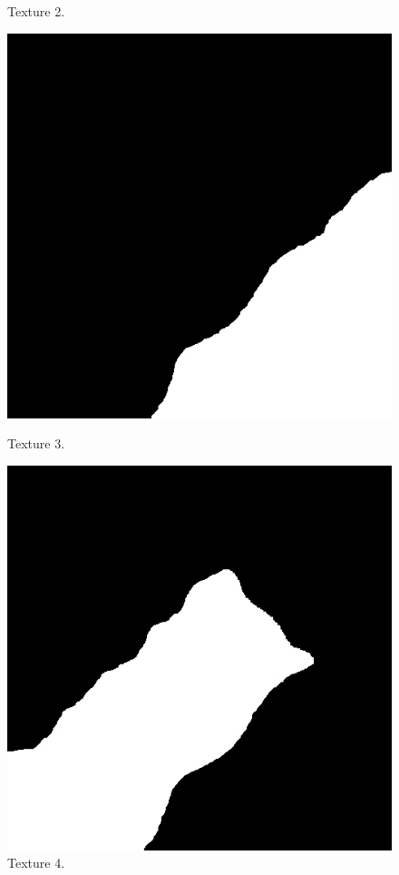 \documentclass[12pt,a4paper,notitlepage,oneside,amsmath,amssymb]{article}
\begin{document}
\begin{CJK*}{UTF8}{bkai}
\begin{enumerate}[label=(\alph*)]
\begin{enumerate}
\begin{figure}[hbt!]
\begin{minipage}{.25\textwidth}
			\caption*{Texture 2.}
		\end{minipage}%
		\begin{minipage}{.25\textwidth}
			\centering
			\includegraphics[width=.9\linewidth]{sample2_texture3}
			\caption*{Texture 3.}
		\end{minipage}%
		\begin{minipage}{.25\textwidth}
			\centering
			\includegraphics[width=.9\linewidth]{sample2_texture4}
			\caption*{Texture 4.}
		\end{minipage}
	\end{figure}


\end{enumerate}
\end{enumerate}
\end{CJK*}
\end{document}
